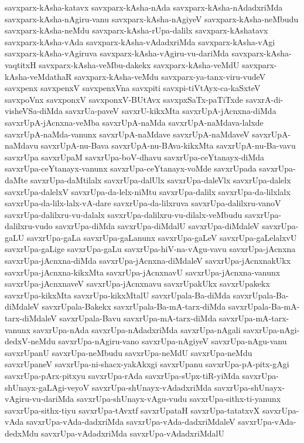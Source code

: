 {savxparx-kAsha-katavx
savxparx-kAsha-nAda
savxparx-kAsha-nAdadxriMda
savxparx-kAsha-nAgiru-vanu
savxparx-kAsha-nAgiyeV
savxparx-kAsha-neMbudu
savxparx-kAsha-neMdu
savxparx-kAsha-rUpa-dalilx
savxparx-kAshatavx
savxparx-kAsha-vAda
savxparx-kAsha-vAdadxriMda
savxparx-kAsha-vAgi
savxparx-kAsha-vAgiruva
savxparx-kAsha-vAgiru-vu-dariMda
savxparx-kAsha-vaqtitxH
savxparx-kAsha-veMbu-dakekx
savxparx-kAsha-veMdU
savxparx-kAsha-veMdathaR
savxparx-kAsha-veMdu
savxparx-ya-tanx-viru-vudeV
savxpenx
savxpenxV
savxpenxVna
savxpiti
savxpi-tiVtAyx-ca-kaSxteV
savxpoVnx
savxponxV
savxponxV-BUtAvx
savxpxSaTx-paTiTxde
savxrA-di-visheVSa-diMda
savxrUa-paveV
savxrU-kikxMta
savxrUpA-jAcnxna-diMda
savxrUpA-jAcnxna-veMba
savxrUpA-naMda
savxrUpA-naMdava-lalxde
savxrUpA-naMda-vanunx
savxrUpA-naMdave
savxrUpA-naMdaveV
savxrUpA-naMdavu
savxrUpA-nu-Bava
savxrUpA-nu-BAva-kikxMta
savxrUpA-nu-Ba-vavu
savxrUpa
savxrUpaM
savxrUpa-boV-dhavu
savxrUpa-ceYtanayx-diMda
savxrUpa-ceYtanayx-vanunx
savxrUpa-ceYtanayx-voMde
savxrUpada
savxrUpa-daMte
savxrUpa-daMtilalx
savxrUpa-dalUlx
savxrUpa-daleVlx
savxrUpa-dalelx
savxrUpa-dalelxV
savxrUpa-da-lelx-niMtu
savxrUpa-dalilx
savxrUpa-da-lilxlalx
savxrUpa-da-lilx-lalx-vA-dare
savxrUpa-da-lilxruva
savxrUpa-dalilxru-vanoV
savxrUpa-dalilxru-vu-dalalx
savxrUpa-dalilxru-vu-dilalx-veMbudu
savxrUpa-dalilxru-vudo
savxrUpa-diMda
savxrUpa-diMdalU
savxrUpa-diMdaleV
savxrUpa-gaLU
savxrUpa-gaLa
savxrUpa-gaLanunx
savxrUpa-gaLeV
savxrUpa-gaLelalxvU
savxrUpa-gaLige
savxrUpa-gaLu
savxrUpa-hiV-na-vAgu-vavu
savxrUpa-jAcnxna
savxrUpa-jAcnxna-diMda
savxrUpa-jAcnxna-diMdaleV
savxrUpa-jAcnxnakUkx
savxrUpa-jAcnxna-kikxMta
savxrUpa-jAcnxnavU
savxrUpa-jAcnxna-vanunx
savxrUpa-jAcnxnaveV
savxrUpa-jAcnxnavu
savxrUpakUkx
savxrUpakekx
savxrUpa-kikxMta
savxrUpa-kikxMtalU
savxrUpala-Ba-diMda
savxrUpala-Ba-diMdaleV
savxrUpala-Bakekx
savxrUpala-Ba-mA-tarx-diMda
savxrUpala-Ba-mA-tarx-diMdaleV
savxrUpala-Bavu
savxrUpa-mA-tarx-diMda
savxrUpa-mA-tarx-vanunx
savxrUpa-nAda
savxrUpa-nAdadxriMda
savxrUpa-nAgali
savxrUpa-nAgi-dedxV-neMdu
savxrUpa-nAgiru-vano
savxrUpa-nAgiyeV
savxrUpa-nAgu-vanu
savxrUpanU
savxrUpa-neMbudu
savxrUpa-neMdU
savxrUpa-neMdu
savxrUpaneV
savxrUpa-ni-shacx-yakAkxgi
savxrUpanu
savxrUpa-pA-pitx-gAgi
savxrUpa-pArx-pitxyu
savxrUpa-rAda
savxrUpa-sUpx-tiR-yiMda
savxrUpa-shUnayx-gaLAgi-veyoV
savxrUpa-shUnayx-vAdadxriMda
savxrUpa-shUnayx-vAgiru-vu-dariMda
savxrUpa-shUnayx-vAgu-vudu
savxrUpa-sithx-ti-yanunx
savxrUpa-sithx-tiyu
savxrUpa-tAvxtf
savxrUpataH
savxrUpa-tatatxvX
savxrUpa-vAda
savxrUpa-vAda-dadxriMda
savxrUpa-vAda-dadxriMdaleV
savxrUpa-vAda-dedxMdu
savxrUpa-vAdadxriMda
savxrUpa-vAdadxriMdalU
}
